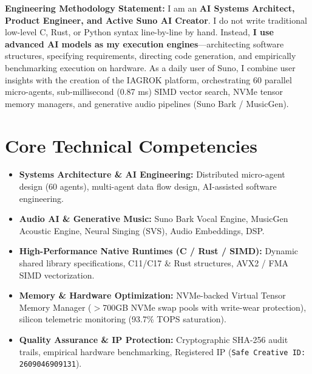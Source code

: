 \documentclass[11pt,a4paper,sans]{moderncv}
\begin{document}
\makecvtitle

\vspace{-10pt}
\small{\textbf{Engineering Methodology Statement:} I am an \textbf{AI Systems Architect, Product Engineer, and Active Suno AI Creator}. I do not write traditional low-level C, Rust, or Python syntax line-by-line by hand. Instead, \textbf{I use advanced AI models as my execution engines}---architecting software structures, specifying requirements, directing code generation, and empirically benchmarking execution on hardware. As a daily user of Suno, I combine user insights with the creation of the IAGROK platform, orchestrating 60 parallel micro-agents, sub-millisecond (0.87 ms) SIMD vector search, NVMe tensor memory managers, and generative audio pipelines (Suno Bark / MusicGen).}

\section{Core Technical Competencies}
\begin{itemize}
\item \textbf{Systems Architecture \& AI Engineering:} Distributed micro-agent design (60 agents), multi-agent data flow design, AI-assisted software engineering.
\item \textbf{Audio AI \& Generative Music:} Suno Bark Vocal Engine, MusicGen Acoustic Engine, Neural Singing (SVS), Audio Embeddings, DSP.
\item \textbf{High-Performance Native Runtimes (C / Rust / SIMD):} Dynamic shared library specifications, C11/C17 \& Rust structures, AVX2 / FMA SIMD vectorization.
\item \textbf{Memory \& Hardware Optimization:} NVMe-backed Virtual Tensor Memory Manager ($>$700GB NVMe swap pools with write-wear protection), silicon telemetric monitoring (93.7\% TOPS saturation).
\item \textbf{Quality Assurance \& IP Protection:} Cryptographic SHA-256 audit trails, empirical hardware benchmarking, Registered IP (\texttt{Safe Creative ID: 2609046909131}).
\end{itemize}
\end{document}
